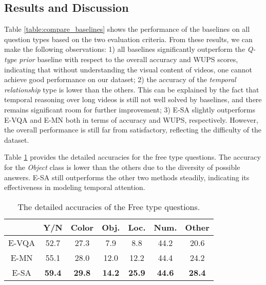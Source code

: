 \documentclass[letterpaper]{article} \usepackage{aaai19}  \usepackage{times}  \usepackage{helvet}  \usepackage{courier}  \usepackage{url}  \usepackage{graphicx}  \usepackage{amsfonts}
\begin{document}
\subsection{Results and Discussion}

Table \ref{table:compare_baselines} shows the performance of the baselines on all question types based on the two evaluation criteria. From these results, we can make the following observations: 1) all baselines significantly outperform the \emph{Q-type prior} baseline with respect to the overall accuracy and WUPS scores, indicating that without understanding the visual content of videos, one cannot achieve good performance on our dataset; 2) the accuracy of the \emph{temporal relationship} type is lower than the others. This can be explained by the fact that temporal reasoning over long videos is still not well solved by baselines, and there remains significant room for further improvement; 3) E-SA slightly outperforms E-VQA and E-MN both in terms of accuracy and WUPS, respectively. However, the overall performance is still far from satisfactory, reflecting the difficulty of the dataset.

Table \ref{table:free_type} provides the detailed accuracies for the free type questions. The accuracy for the \emph{Object} class is lower than the others due to the diversity of possible answers. E-SA still outperforms the other two methods steadily, indicating its effectiveness in modeling temporal attention.

\begin{table}
\centering
\caption{The detailed accuracies of the Free type questions.}
\label{table:free_type}
\begin{tabular}{c|cccccc}
\toprule
 & Y/N & Color & Obj.& Loc.  & Num. & Other \\
\midrule
E-VQA &52.7 &	27.3&	7.9&	8.8&	44.2&	20.6	\\
E-MN &55.1&	28.0&	12.0&	12.2&	44.4&	24.2\\
E-SA & \textbf{59.4} & \textbf{29.8} & \textbf{14.2} & \textbf{25.9} & \textbf{44.6} & \textbf{28.4}\\
\bottomrule
\end{tabular}
\end{table}
\end{document}
